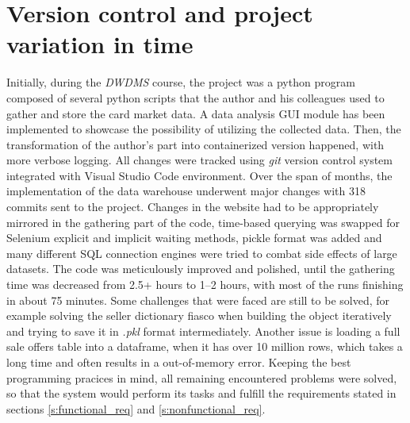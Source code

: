 \section{Version control and project variation in time}
Initially, during the \textit{DWDMS} course, the project was a python program composed of several python scripts that the author and his colleagues used to gather and store the card market data. A data analysis GUI module has been implemented to showcase the possibility of utilizing the collected data. Then, the transformation of the author's part into containerized version happened, with more verbose logging. All changes were tracked using \textit{git} version control system integrated with Visual Studio Code environment. Over the span of months, the implementation of the data warehouse underwent major changes with 318 commits sent to the project. Changes in the website had to be appropriately mirrored in the gathering part of the code, time-based querying was swapped for Selenium explicit and implicit waiting methods, pickle format was added and many different SQL connection engines were tried to combat side effects of large datasets. The code was meticulously improved and polished, until the gathering time was decreased from 2.5+ hours to 1--2 hours, with most of the runs finishing in about 75 minutes. Some challenges that were faced are still to be solved, for example solving the seller dictionary fiasco when building the object iteratively and trying to save it in \textit{.pkl} format intermediately. Another issue is loading a full sale offers table into a dataframe, when it has over 10 million rows, which takes a long time and often results in a out-of-memory error. Keeping the best programming pracices in mind, all remaining encountered problems were solved, so that the system would perform its tasks and fulfill the requirements stated in sections \ref{s:functional_req} and \ref{s:nonfunctional_req}.
